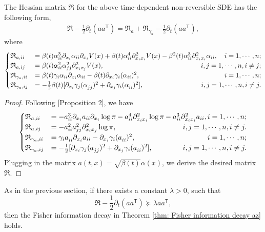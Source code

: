 \documentclass[11pt,reqno]{amsart}
\newcommand{\ts}{\mathsf{T}}
\newcommand{\bea}{\begin{eqnarray}}
\newcommand{\eea}{\end{eqnarray}}
\newcommand{\beaa}{\begin{eqnarray*}}
\newcommand{\eeaa}{\end{eqnarray*}}
\def\pa{\partial}
\def\qed{ \hfill \vrule width.25cm height.25cm depth0cm\smallskip}
\begin{document}
\begin{proposition}\label{prop: non deg non rev a}
    The Hessian matrix $\mathfrak R$ for the above time-dependent non-reversible SDE  has the following form,
    \beaa 
    \mathfrak R-\frac{1}{2}\pa_t(aa^{\ts})= \mathfrak R_a + \mathfrak R_{\gamma_a}-\frac{1}{2}\pa_t(aa^{\ts}),
    \eeaa 
    where %
    \bea \label{ricci curvature}
\begin{cases}
\mathfrak R_{a,ii}&=\beta(t )\alpha_{ii}^3\partial_{x_i}\alpha_{ii}\partial_{x_i}V(x) 
 +\beta(t)\alpha_{ii}^4\partial^2_{x_ix_i}V(x)-\beta^2(t)\alpha_{ii}^3\partial_{x_ix_i}^2\alpha_{ii}
, \quad \hfill  i=1,\cdots,n;\\
\mathfrak R_{a,ij}&=\beta(t)\alpha_{ii}^2\alpha_{jj}^2\partial^2_{x_ix_j}V(x), \hfill i,j=1,\cdots,n,  i\neq j;\\
\mathfrak R_{\gamma_a,ii}&=\beta(t)\gamma_i\alpha_{ii}\pa_{x_i}\alpha_{ii}-\beta(t)\pa_{x_i}\gamma_i (\alpha_{ii} )^2,  \hfill i=1,\cdots,n;\\
\mathfrak R_{\gamma_a,ij}&=-\frac{1}{2}\beta(t)[\pa_{x_i}\gamma_j (\alpha^{}_{jj})^2+ \pa_{x_j}\gamma_i (\alpha^{}_{ii})^2 ], \hfill i,j=1,\cdots,n, i\neq j.  
\end{cases}
\eea 
\end{proposition}
\begin{proof}
    Following \cite{FengLi2021}[Proposition 2],  we have 
        \bea 
\begin{cases}
\mathfrak R_{a,ii}&=  -a_{ii}^3\partial_{x_i}a_{ii}\partial_{x_i}\log \pi-a_{ii}^4\partial^2_{x_ix_i}\log \pi-a_{ii}^3\partial_{x_ix_i}^2a_{ii} , \hfill  i=1,\cdots,n;\\
\mathfrak R_{a,ij}&=-a_{ii}^2a_{jj}^2\partial^2_{x_ix_j}\log \pi, \hfill i,j=1,\cdots,n,  i\neq j.\\
\mathfrak R_{\gamma_a,ii}&=\gamma_ia^{}_{ii}\pa_{x_i}a_{ii}-\pa_{x_i}\gamma_i (a^{}_{ii} )^2,  \hfill i=1,\cdots,n;\\
\mathfrak R_{\gamma_a,ij}&=-\frac{1}{2}[\pa_{x_i}\gamma_j (a^{}_{jj})^2+ \pa_{x_j}\gamma_i (a^{}_{ii})^2 ], \hfill i,j=1,\cdots,n, i\neq j.  
\end{cases}\nonumber 
\eea 
Plugging in the matrix $a(t,x)=\sqrt{\beta(t)}\alpha(x)$, we derive the desired matrix $\mathfrak R$. \qed
\end{proof}
As in the previous section, if there exists a constant $\lambda>0$, such that 
\begin{equation*}
\mathfrak{R}-\frac{1}{2}\pa_t(aa^{\ts})\succeq \lambda aa^{\ts}, 
\end{equation*}
then the Fisher information decay in Theorem \ref{thm: Fisher information decay az} holds.
\end{document}
